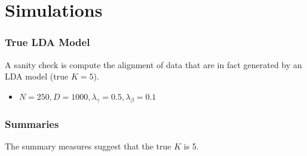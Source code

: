 \documentclass[hyperref={colorlinks=true, linkcolor=violet, citecolor=SeaGreen}]{beamer}
\begin{document}
\section{Simulations}

\begin{frame}
  \frametitle{True LDA Model}
  A sanity check is compute the alignment of data that are in fact generated by an
  LDA model (true $K = 5$).
  \begin{itemize}
  \item $N = 250, D = 1000, \lambda_{\gamma} = 0.5, \lambda_{\beta} = 0.1$
  \end{itemize}

  \begin{figure}
  \end{figure}
\end{frame}

\begin{frame}
  \frametitle{Summaries}
  The summary measures suggest that the true $K$ is 5.
  \begin{figure}
    \hfil
  \end{figure}
\end{frame}
\end{document}
